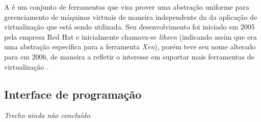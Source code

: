 
A \libvirt{} é um conjunto de ferramentas que visa prover uma abstração
uniforme para gerenciamento de máquinas virtuais de maneira independente da
da aplicação de virtualização que está sendo utilizada. Seu desenvolvimento
foi iniciado em 2005 pela empresa Red Hat e inicialmente chamava-se
\emph{libxen} (indicando assim que era uma abstração específica para a
ferramenta \emph{Xen}), porém teve seu nome alterado para \libvirt{} em
2006, de maneira a refletir o interesse em suportar mais ferramentas de
virtualização .

\subsection{Interface de programação}\label{sec:libvirtapi}

\emph{Trecho ainda não concluído}.
